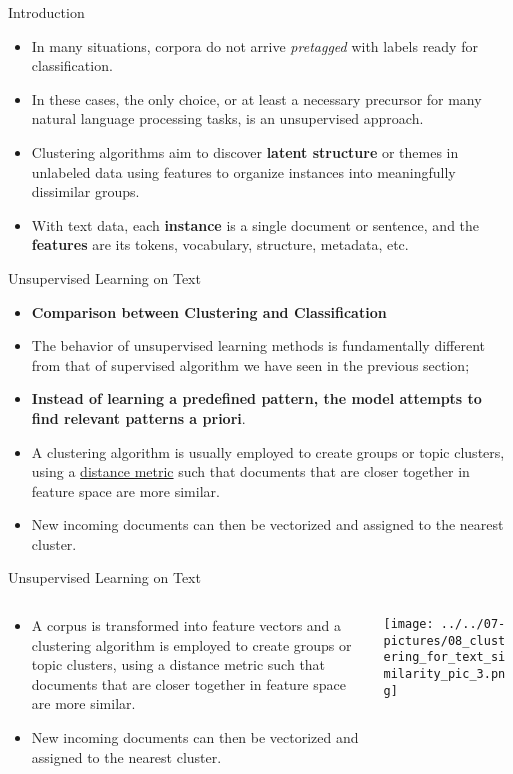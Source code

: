 \documentclass[11pt]{beamer}
\begin{document}
\begin{frame}{Introduction}
	\begin{itemize}
		\item In many situations, corpora do not arrive \textit{pretagged} with labels ready for classification. 
		\item In these cases, the only choice, or at least a necessary precursor for many natural language processing tasks, is an unsupervised approach. 
		\item Clustering algorithms aim to discover \textbf{latent structure} or themes in unlabeled data using features to organize instances into meaningfully dissimilar groups.
		\item With text data, each \textbf{ instance} is a single document or sentence, and the \textbf{features} are its tokens, vocabulary, structure, metadata, etc.
	\end{itemize}
\end{frame}
\begin{frame}{Unsupervised Learning on Text}
	\begin{itemize}
		\item \textbf{Comparison between Clustering and Classification}
		\item The behavior of unsupervised learning methods is fundamentally different from that of supervised algorithm we have seen in the previous section; 
		\item \textbf{Instead of learning a predefined pattern, the model attempts to find relevant patterns a priori}.
		\item A clustering algorithm is usually employed to create groups or topic clusters, using a \underline{distance metric} such that documents that are closer together in feature space are more similar. 
		\item New incoming documents can then be vectorized and assigned to the nearest cluster.
	\end{itemize}
\end{frame}
\begin{frame}{Unsupervised Learning on Text}
\begin{columns}[T] %
\begin{column}{.48\textwidth}
        \begin{itemize}
		\item A corpus is transformed into feature vectors and a clustering algorithm is employed to create groups or topic clusters, using a distance metric such that documents that are closer together in feature space are more similar. 
		\item New incoming documents can then be vectorized and assigned to the nearest cluster.
        \end{itemize}
\end{column}%
\hfill%
\begin{column}{.48\textwidth}
        \texttt{[image: ../../07-pictures/08\_clustering\_for\_text\_similarity\_pic\_3.png]}
\end{column}%
\end{columns}
\end{frame}
\end{document}
